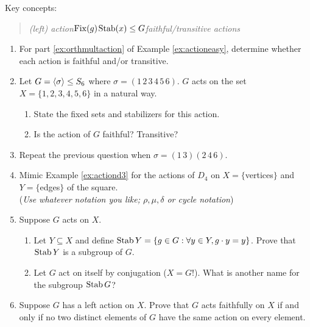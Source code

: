 


\begin{exercises}{}{}
Key concepts:
\begin{quote}
	\emph{(left) action\quad $\operatorname{Fix}(g)$\quad $\operatorname{Stab}(x)\le G$\quad faithful/transitive actions}
\end{quote}

\begin{enumerate}
  \item For part \ref*{ex:orthmultaction} of Example \ref{ex:actioneasy}, determine whether each action is faithful and/or transitive.

	
	\item\label{exs:orbitsigma1} Let $G=\left\langle \sigma\right\rangle\le S_6$ where $\sigma=(1\,2\,3\,4\,5\,6)$. $G$ acts on the set $X=\{1,2,3,4,5,6\}$ in a natural way.
	\begin{enumerate}
	  \item State the fixed sets and stabilizers for this action.
	  \item Is the action of $G$ faithful? Transitive?
	\end{enumerate}
	
	
	\item\label{exs:orbitsigma2} Repeat the previous question when $\sigma=(1\,3)(2\,4\,6)$.
	

	\item Mimic Example \ref{ex:actiond3} for the actions of $D_4$ on $X=\{$vertices$\}$ and $Y=\{$edges$\}$ of the square.\\
	(\emph{Use whatever notation you like; $\rho,\mu,\delta$ or cycle notation})


	\item Suppose $G$ acts on $X$.
	\begin{enumerate}
	  \item Let $Y\subseteq X$ and define $\operatorname{Stab} Y=\{g\in G:\forall y\in Y, g\cdot y=y\}$. Prove that $\operatorname{Stab} Y$ is a subgroup of $G$.
		\item Let $G$ act on itself by conjugation ($X=G$!). What is another name for the subgroup $\operatorname{Stab} G$?
	\end{enumerate}
	

	\item Suppose $G$ has a left action on $X$. Prove that $G$ acts faithfully on $X$ if and only if no two distinct elements of $G$ have the same action on every element.

\end{enumerate}
\end{exercises}

